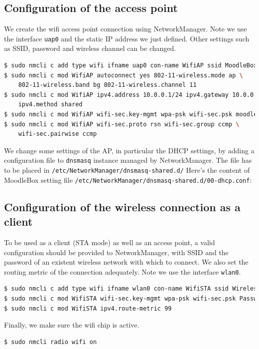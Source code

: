 \documentclass[12pt]{article}
\begin{document}
\subsection{Configuration of the access point}

We create the wifi access point connection using NetworkManager.
Note we use the interface \lstinline{uap0} and the static IP address we just defined.
Other settings such as SSID, password and wireless channel can be changed.
\begin{lstlisting}[language=bash]
$ sudo nmcli c add type wifi ifname uap0 con-name WifiAP ssid MoodleBox
$ sudo nmcli c mod WifiAP autoconnect yes 802-11-wireless.mode ap \
    802-11-wireless.band bg 802-11-wireless.channel 11
$ sudo nmcli c mod WifiAP ipv4.address 10.0.0.1/24 ipv4.gateway 10.0.0.1 \
    ipv4.method shared
$ sudo nmcli c mod WifiAP wifi-sec.key-mgmt wpa-psk wifi-sec.psk moodlebox
$ sudo nmcli c mod WifiAP wifi-sec.proto rsn wifi-sec.group ccmp \
    wifi-sec.pairwise ccmp
\end{lstlisting}

We change some settings of the AP, in particular the DHCP settings, by adding a configuration file to \lstinline{dnsmasq} instance managed by NetworkManager.
The file has to be placed in \lstinline{/etc/NetworkManager/dnsmasq-shared.d/}
Here's the content of MoodleBox setting file \lstinline{/etc/NetworkManager/dnsmasq-shared.d/00-dhcp.conf}:


\subsection{Configuration of the wireless connection as a client}

To be used as a client (STA mode) as well as an access point, a valid configuration should be provided to NetworkManager, with SSID and the password of an existent wireless network with which to connect.
We also set the routing metric of the connection adequately.
Note we use the interface \lstinline{wlan0}.
\begin{lstlisting}[language=bash]
$ sudo nmcli c add type wifi ifname wlan0 con-name WifiSTA ssid WirelessLAN
$ sudo nmcli c mod WifiSTA wifi-sec.key-mgmt wpa-psk wifi-sec.psk Password
$ sudo nmcli c mod WifiSTA ipv4.route-metric 99
\end{lstlisting}

Finally, we make sure the wifi chip is active.
\begin{lstlisting}[language=bash]
$ sudo nmcli radio wifi on
\end{lstlisting}
\end{document}
